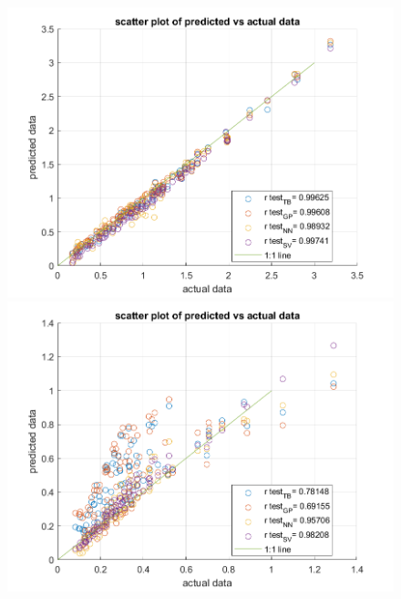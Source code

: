 \documentclass[12pt]{iopart}
\begin{document}
\begin{figure}[ht!]
\begin{center}
\begin{minipage}{0.495\textwidth}
    \includegraphics[width=1\textwidth]{disp_12T.png}
\end{minipage}
\begin{minipage}{0.495\textwidth}
    \includegraphics[width=1\textwidth]{cond_12T.png}
\end{minipage}
\begin{minipage}{0.495\textwidth}

\end{minipage}
\end{center}
\end{figure}
\end{document}
